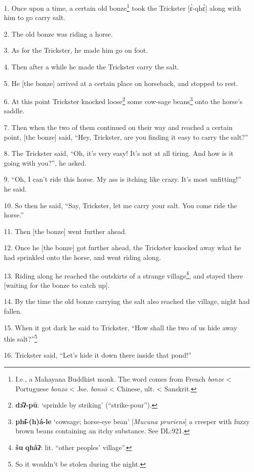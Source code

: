 \setcounter{footnote}{0}

1. Once upon a time, a certain old bonze\footnote{I.e., a Mahayana Buddhist monk. The word comes from French \textit{bonze} < Portuguese \textit{bonzo} < Jse. \textit{bonsō} < Chinese, ult. < Sanskrit.} took the Trickster [ɛ̀-qhɛ̀] along
with him to go carry salt.

2. The old bonze was riding a horse.

3. As for the Trickster, he made him go on foot.

4. Then after a while he made the Trickster carry the salt.

5. He [the bonze] arrived at a certain place on horseback, and stopped to rest.

6. At this point Trickster knocked loose\footnote{\textbf{dɔ̂ʔ-pū}: `sprinkle by striking' (``strike-pour'').} some cow-sage beans\footnote{\textbf{phɨ̂-(h)á-le} `cowsage; horse-eye bean' [\textit{Mucuna pruriens}] a creeper with fuzzy brown beans containing an itchy substance. See DL:921.} onto the horse's
saddle.

7. Then when the two of them continued on their way and reached a certain point,
[the bonze] said, ``Hey, Trickster, are you finding it easy to carry the salt?''

8. The Trickster said, ``Oh, it's very easy! It's not at all tiring. And how is
it going with you?'', he asked.

9. ``Oh, I can't ride this horse. My ass is itching like crazy. It's most unfitting!''
he said.

10. So then he said, ``Say, Trickster, let me carry your salt. You come ride the
horse.''

11. Then [the bonze] went further ahead.

12. Once he [the bonze] got further ahead, the Trickster knocked away what he had
sprinkled onto the horse, and went riding along.

13. Riding along he reached the outskirts of a strange village\footnote{\textbf{šu} \textbf{qhâʔ}: lit. ``other peoples' village''.}, and stayed
there [waiting for the bonze to catch up].

14. By the time the old bonze carrying the salt also reached the village, night
had fallen.

15. When it got dark he said to Trickster, ``How shall the two of us hide away
this salt?''\footnote{So it wouldn't be stolen during the night.}

16. Trickster said, ``Let's hide it down there inside that pond!''

